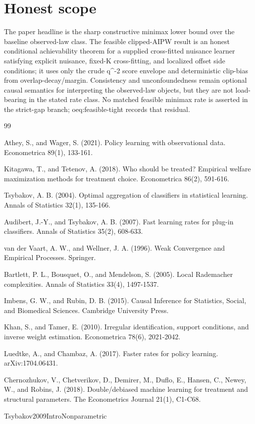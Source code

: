 \documentclass{article}
\begin{document}
\section{Honest scope}

The paper headline is the sharp constructive minimax lower bound over the baseline observed-law class. The feasible clipped-AIPW result is an honest conditional achievability theorem for a supplied cross-fitted nuisance learner satisfying explicit nuisance, fixed-K cross-fitting, and localized offset side conditions; it uses only the crude q^{-2} score envelope and deterministic clip-bias from overlap-decay/margin. Consistency and unconfoundedness remain optional causal semantics for interpreting the observed-law objects, but they are not load-bearing in the stated rate class. No matched feasible minimax rate is asserted in the strict-gap branch; oeq:feasible-tight records that residual.

\begin{thebibliography}{99}

   Athey, S., and Wager, S. (2021). Policy learning with observational data. Econometrica 89(1), 133-161.

   Kitagawa, T., and Tetenov, A. (2018). Who should be treated? Empirical welfare maximization methods for treatment choice. Econometrica 86(2), 591-616.

   Tsybakov, A. B. (2004). Optimal aggregation of classifiers in statistical learning. Annals of Statistics 32(1), 135-166.

   Audibert, J.-Y., and Tsybakov, A. B. (2007). Fast learning rates for plug-in classifiers. Annals of Statistics 35(2), 608-633.

   van der Vaart, A. W., and Wellner, J. A. (1996). Weak Convergence and Empirical Processes. Springer.

   Bartlett, P. L., Bousquet, O., and Mendelson, S. (2005). Local Rademacher complexities. Annals of Statistics 33(4), 1497-1537.

   Imbens, G. W., and Rubin, D. B. (2015). Causal Inference for Statistics, Social, and Biomedical Sciences. Cambridge University Press.

   Khan, S., and Tamer, E. (2010). Irregular identification, support conditions, and inverse weight estimation. Econometrica 78(6), 2021-2042.

   Luedtke, A., and Chambaz, A. (2017). Faster rates for policy learning. arXiv:1704.06431.

   Chernozhukov, V., Chetverikov, D., Demirer, M., Duflo, E., Hansen, C., Newey, W., and Robins, J. (2018). Double/debiased machine learning for treatment and structural parameters. The Econometrics Journal 21(1), C1-C68.

   Tsybakov2009IntroNonparametric

\end{thebibliography}
\end{document}
